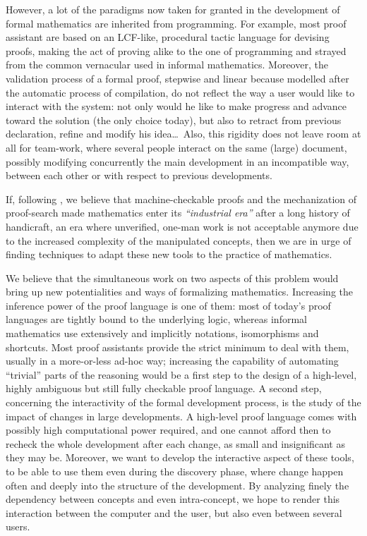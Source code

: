 \documentclass[twoside,a4paper,12pt]{article}
\begin{document}
However, a lot of the paradigms now taken for granted in the
development of formal mathematics are inherited from programming. For
example, most proof assistant are based on an LCF-like, procedural
tactic language for devising proofs, making the act of proving alike
to the one of programming and strayed from the common vernacular used
in informal mathematics. Moreover, the validation process of a formal
proof, stepwise and linear because modelled after the automatic
process of compilation, do not reflect the way a user would like to
interact with the system: not only would he like to make progress and
advance toward the solution (the only choice today), but also to
retract from previous declaration, refine and modify his idea\ldots\
Also, this rigidity does not leave room at all for team-work, where
several people interact on the same (large) document, possibly
modifying concurrently the main development in an incompatible way,
between each other or with respect to previous developments.

If, following \cite{dowek2007metamorphoses}, we believe that
machine-checkable proofs and the mechanization of proof-search made
mathematics enter its \emph{``industrial era''} after a long history
of handicraft, an era where unverified, one-man work is not acceptable
anymore due to the increased complexity of the manipulated concepts,
then we are in urge of finding techniques to adapt these new tools to
the practice of mathematics.

We believe that the simultaneous work on two aspects of this problem
would bring up new potentialities and ways of formalizing mathematics.
Increasing the inference power of the proof language is one of them:
most of today's proof languages are tightly bound to the underlying
logic, whereas informal mathematics use extensively and implicitly
notations, isomorphisms and shortcuts. Most proof assistants provide
the strict minimum to deal with them, usually in a more-or-less ad-hoc
way; increasing the capability of automating ``trivial'' parts of the
reasoning would be a first step to the design of a high-level, highly
ambiguous but still fully checkable proof language. A second step,
concerning the interactivity of the formal development process, is the
study of the impact of changes in large developments. A high-level
proof language comes with possibly high computational power required,
and one cannot afford then to recheck the whole development after each
change, as small and insignificant as they may be. Moreover, we want
to develop the interactive aspect of these tools, to be able to use
them even during the discovery phase, where change happen often and
deeply into the structure of the development. By analyzing finely the
dependency between concepts and even intra-concept, we hope to render
this interaction between the computer and the user, but also even
between several users.
\end{document}
